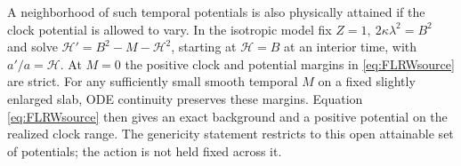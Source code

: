 A neighborhood of such temporal potentials is also physically attained if the clock potential is allowed to vary. In the isotropic model fix \(Z=1,\ 2\kappa\lambda^2=B^2\) and solve \(\mathcal H'=B^2-M-\mathcal H^2\), starting at \(\mathcal H=B\) at an interior time, with \(a'/a=\mathcal H\). At \(M=0\) the positive clock and potential margins in \eqref{eq:FLRWsource} are strict. For any sufficiently small smooth temporal \(M\) on a fixed slightly enlarged slab, ODE continuity preserves these margins. Equation \eqref{eq:FLRWsource} then gives an exact background and a positive potential on the realized clock range. The genericity statement restricts to this open attainable set of potentials; the action is not held fixed across it.
